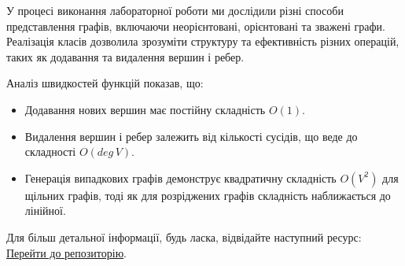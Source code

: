 \documentclass{article}
\begin{document}
У процесі виконання лабораторної роботи ми дослідили різні способи представлення графів, включаючи неорієнтовані, орієнтовані та зважені графи. Реалізація класів дозволила зрозуміти структуру та ефективність різних операцій, таких як додавання та видалення вершин і ребер.

Аналіз швидкостей функцій показав, що:
\begin{itemize}
    \item Додавання нових вершин має постійну складність \(O(1)\).
    \item Видалення вершин і ребер залежить від кількості сусідів, що веде до складності \(O(deg \, V)\).
    \item Генерація випадкових графів демонструє квадратичну складність \(O(V^2)\) для щільних графів, тоді як для розріджених графів складність наближається до лінійної.
\end{itemize}

Для більш детальної інформації, будь ласка, відвідайте наступний ресурс:
\href{https://github.com/gre1wy/AppliedAlgorithms/tree/main/lab1}{Перейти до репозиторію}.
\end{document}
